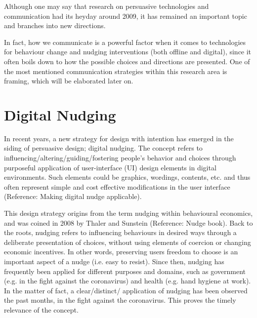 
Although one may say that research on persuasive technologies and communication had its heyday around 2009, it has remained an important topic and  branches into new directions. 

In fact, how we communicate is a powerful factor when it comes to technologies for behaviour change and nudging interventions (both offline and digital), since it often boils down to how the possible choices and directions are presented. One of the most mentioned communication strategies within this research area is framing, which will be elaborated  later on.

\section{Digital Nudging}
In recent years, a new strategy for design with intention has emerged in the siding of persuasive design; digital nudging. The concept refers to influencing/altering/guiding/fostering people's behavior and choices through purposeful application of user-interface (UI) design elements in digital environments. Such elements could be graphics, wordings, contents, etc. and thus often represent simple and cost effective modifications in the user interface (Reference: Making digital nudge applicable). 

This design strategy origins from the term nudging within behavioural economics, and was coined in 2008 by Thaler and Sunstein (Reference: Nudge book). Back to the roots, nudging refers to influencing behaviours in desired ways through a deliberate presentation of choices, without using elements of coercion or changing economic incentives. In other words, preserving users freedom to choose is an important aspect of a nudge (i.e. easy to resist). Since then, nudging has frequently been applied for different purposes and domains, such as government (e.g. in the fight against the coronavirus) and health (e.g. hand hygiene at work). In the matter of fact, a clear/distinct/ application of nudging has been observed the past months, in the fight against the coronavirus. This proves the timely relevance of the concept. 

